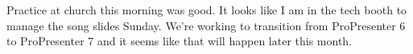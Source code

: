 Practice at church this morning was good. It looks like I am in the tech
booth to manage the song slides Sunday. We're working to transition from
ProPresenter 6 to ProPresenter 7 and it seems like that will happen
later this month.

